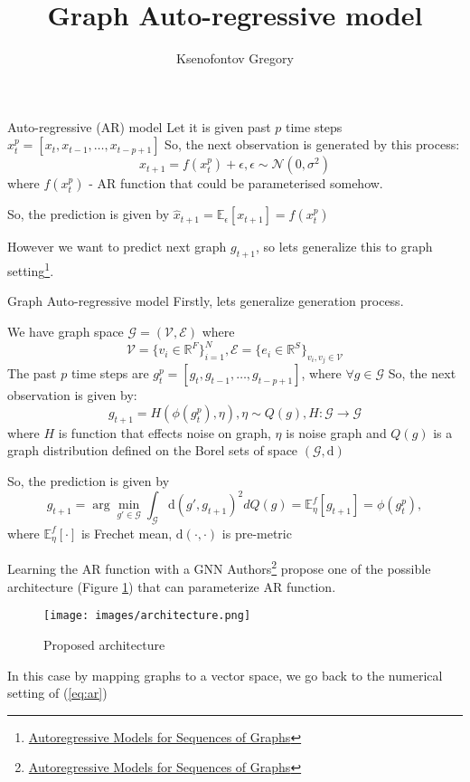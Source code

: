 \documentclass{beamer}
\title{Graph Auto-regressive model}
\author{Ksenofontov Gregory}
\institute{MIPT}
\begin{document}
\begin{frame}
    \titlepage
\end{frame}

\begin{frame}{Auto-regressive (AR) model}
    Let it is given past $p$ time steps $x^p_t=[x_t, x_{t-1}, \dots, x_{t-p+1}]$
    So, the next observation is generated by this process:
    \begin{equation}
        x_{t+1} = f(x^p_t) + \epsilon, \epsilon \sim \mathcal{N}(0, \sigma^2)
    \label{eq:ar}
    \end{equation}
    where $f(x^p_t)$ - AR function that could be parameterised somehow. \par
    So, the prediction is given by $\hat x_{t+1} = \mathbb{E}_\epsilon\left[x_{t+1}\right] = f(x^p_t)$ \par
    However we want to predict next graph $g_{t+1}$, so lets generalize this to graph setting\footnote{\href{https://arxiv.org/pdf/1903.07299.pdf}{Autoregressive Models for Sequences of Graphs}}.
\end{frame}
\begin{frame}{Graph Auto-regressive model}
    Firstly, lets generalize generation process.\par
    We have graph space
    $\mathcal{G} = \left(\mathcal{V}, \mathcal{E}\right)$
    where 
    $$\mathcal{V} = \{v_i\in \mathbb{R}^F\}_{i=1}^N, \mathcal{E} = \{e_i\in \mathbb{R}^S\}_{v_i, v_j \in \mathcal{V}}$$
    The past $p$ time steps are $g^p_t=[g_t, g_{t-1}, \dots, g_{t-p+1}]$, where $\forall g\in \mathcal{G}$
    So, the next observation is given by:
    \begin{equation}
        g_{t+1} = H\left(\phi(g^p_t), \eta\right), \eta\sim Q(g), H:\mathcal{G}\xrightarrow{}\mathcal{G}
    \end{equation}
    where $H$ is function that effects noise on graph, $\eta$ is noise graph and $Q(g)$ is a graph distribution defined on the Borel sets of space $(\mathcal{G}, \mathrm{d})$\par
    So, the prediction is given by $$\hat g_{t+1} = \arg\min_{g'\in\mathcal{G}}\int_\mathcal{G}\mathrm{d}( g', g_{t+1})^2dQ(g)= \mathbb{E}^f_\eta\left[g_{t+1}\right] =  \phi(g^p_t),$$ 
    where $\mathbb{E}^f_\eta\left[\cdot\right]$ is Frechet mean, $\mathrm{d}(\cdot, \cdot)$ is pre-metric
    
\end{frame}
\begin{frame}{Learning the AR function with a GNN}
    Authors\footnote{\href{https://arxiv.org/pdf/1903.07299.pdf}{Autoregressive Models for Sequences of Graphs}} propose one of the possible architecture (Figure \ref{fig:arch}) that can parameterize AR function.
    \begin{figure}
        \centering
        \texttt{[image: images/architecture.png]}
        \caption{Proposed architecture}
        \label{fig:arch}
     \end{figure}
    In this case by mapping graphs to a vector space, we go back to the numerical setting of (\ref{eq:ar}) 
\end{frame}
\end{document}
